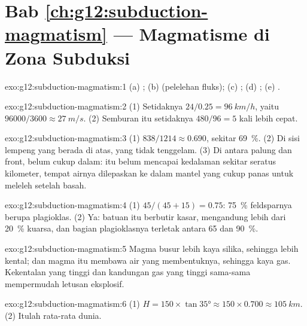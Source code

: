 \section*{Bab \ref{ch:g12:subduction-magmatism} --- Magmatisme di Zona Subduksi}

\begin{solution}{exo:g12:subduction-magmatism:1}
(a) ; (b)  (pelelehan fluks); (c) ;
(d) ; (e) .
\end{solution}

\begin{solution}{exo:g12:subduction-magmatism:2}
(1) Setidaknya $24/0.25 = \qty{96}{km/h}$, yaitu $\num{96000}/3600 \approx
\qty{27}{m/s}$. (2) Semburan itu setidaknya $480/96 = 5$ kali lebih cepat.
\end{solution}

\begin{solution}{exo:g12:subduction-magmatism:3}
(1) $838/1214 \approx 0.690$, sekitar \qty{69}{\percent}. (2) Di sisi lempeng
yang berada di atas, yang tidak tenggelam. (3) Di antara palung dan front,
 belum cukup dalam:  itu belum mencapai kedalaman sekitar
seratus kilometer, tempat airnya dilepaskan ke dalam mantel yang cukup panas
untuk meleleh setelah basah.
\end{solution}

\begin{solution}{exo:g12:subduction-magmatism:4}
(1) $45/(45 + 15) = 0.75$: \qty{75}{\percent} feldsparnya berupa plagioklas.
(2) Ya: batuan itu berbutir kasar, mengandung lebih dari \qty{20}{\percent}
kuarsa, dan bagian plagioklasnya terletak antara 65 dan
\qty{90}{\percent}.
\end{solution}

\begin{solution}{exo:g12:subduction-magmatism:5}
Magma busur lebih kaya silika, sehingga lebih kental; dan magma itu membawa air
yang membentuknya, sehingga kaya gas. Kekentalan yang tinggi dan kandungan gas
yang tinggi sama-sama mempermudah letusan eksplosif.
\end{solution}

\begin{solution}{exo:g12:subduction-magmatism:6}
(1) $H = 150 \times \tan\ang{35} \approx 150 \times 0.700 \approx
\qty{105}{km}$. (2) Itulah rata-rata dunia.
\end{solution}

